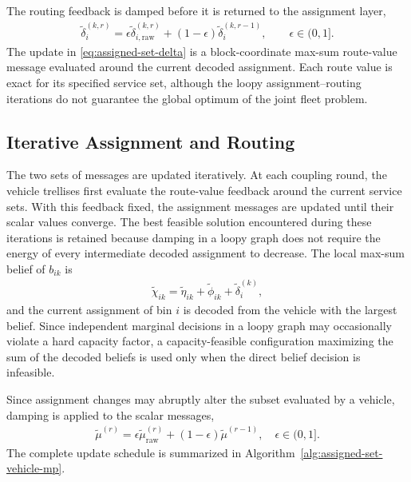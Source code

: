 The routing feedback is damped before it is returned to the assignment layer,
\begin{align}
 \widetilde\delta_i^{(k,r)}
 =\epsilon\widetilde\delta_{i,\mathrm{raw}}^{(k,r)}
 +(1-\epsilon)\widetilde\delta_i^{(k,r-1)},
 \qquad \epsilon\in(0,1].
 \label{eq:assigned-set-damping}
\end{align}
The update in \eqref{eq:assigned-set-delta} is a block-coordinate max-sum route-value message evaluated around the current decoded assignment. Each route value is exact for its specified service set, although the loopy assignment--routing iterations do not guarantee the global optimum of the joint fleet problem.

\subsection{Iterative Assignment and Routing}
\label{sec:iterative-algorithm}

The two sets of messages are updated iteratively. At each coupling round, the vehicle trellises first evaluate the route-value feedback around the current service sets. With this feedback fixed, the assignment messages are updated until their scalar values converge. The best feasible solution encountered during these iterations is retained because damping in a loopy graph does not require the energy of every intermediate decoded assignment to decrease. The local max-sum belief of $b_{ik}$ is
\begin{align}
    \widetilde{\chi}_{ik}
    =\widetilde{\eta}_{ik}+\widetilde{\phi}_{ik}
    +\widetilde{\delta}_i^{(k)},
    \label{eq:assignment-belief}
\end{align}
and the current assignment of bin $i$ is decoded from the vehicle with the largest belief. Since independent marginal decisions in a loopy graph may occasionally violate a hard capacity factor, a capacity-feasible configuration maximizing the sum of the decoded beliefs is used only when the direct belief decision is infeasible.

Since assignment changes may abruptly alter the subset evaluated by a vehicle, damping is applied to the scalar messages,
\begin{align}
    \widetilde{\mu}^{(r)} = \epsilon\widetilde{\mu}_{\mathrm{raw}}^{(r)} + (1-\epsilon)\widetilde{\mu}^{(r-1)}, \quad \epsilon\in(0,1]. \label{eq:damping}
\end{align}
The complete update schedule is summarized in Algorithm~\ref{alg:assigned-set-vehicle-mp}.

